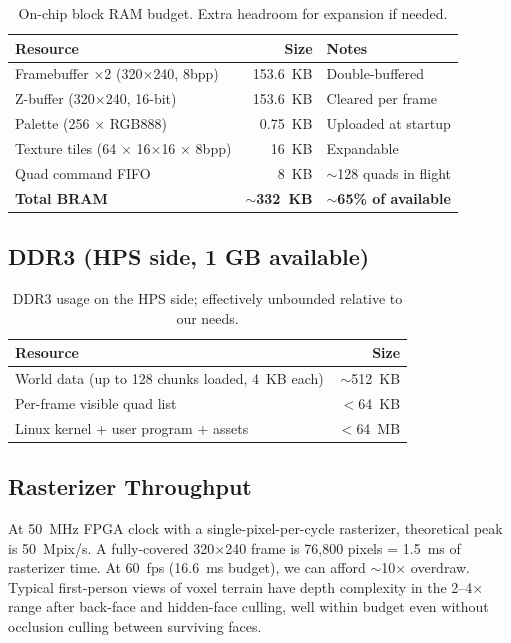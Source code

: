 \documentclass[11pt]{article}
\begin{document}
\begin{table}[h]
\centering
\begin{tabular}{lrl}
\toprule
\textbf{Resource} & \textbf{Size} & \textbf{Notes} \\
\midrule
Framebuffer $\times$2 (320$\times$240, 8bpp) & 153.6~KB & Double-buffered \\
Z-buffer (320$\times$240, 16-bit) & 153.6~KB & Cleared per frame \\
Palette (256 $\times$ RGB888) & 0.75~KB & Uploaded at startup \\
Texture tiles (64 $\times$ 16$\times$16 $\times$ 8bpp) & 16~KB & Expandable \\
Quad command FIFO & 8~KB & $\sim$128 quads in flight \\
\midrule
\textbf{Total BRAM} & \textbf{$\sim$332~KB} & \textbf{$\sim$65\% of available} \\
\bottomrule
\end{tabular}
\caption{On-chip block RAM budget. Extra headroom for expansion if needed.}
\end{table}

\subsection{DDR3 (HPS side, 1 GB available)}

\begin{table}[h]
\centering
\begin{tabular}{lr}
\toprule
\textbf{Resource} & \textbf{Size} \\
\midrule
World data (up to 128 chunks loaded, 4~KB each) & $\sim$512~KB \\
Per-frame visible quad list & $<$64~KB \\
Linux kernel + user program + assets & $<$64~MB \\
\bottomrule
\end{tabular}
\caption{DDR3 usage on the HPS side; effectively unbounded relative to our needs.}
\end{table}

\subsection{Rasterizer Throughput}

At 50~MHz FPGA clock with a single-pixel-per-cycle rasterizer, theoretical peak is 50~Mpix/s. A fully-covered 320$\times$240 frame is 76{,}800 pixels = 1.5~ms of rasterizer time. At 60~fps (16.6~ms budget), we can afford $\sim$10$\times$ overdraw. Typical first-person views of voxel terrain have depth complexity in the 2--4$\times$ range after back-face and hidden-face culling, well within budget even without occlusion culling between surviving faces.
\end{document}
